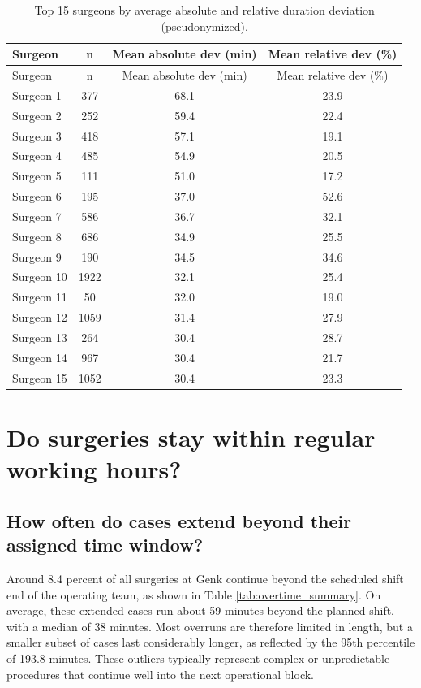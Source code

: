 \documentclass[
]{article}
\begin{document}
\begin{longtable}[]{@{}lccc@{}}
\caption{Top 15 surgeons by average absolute and relative duration
deviation (pseudonymized). \label{tab:surgeon_deviation}}\tabularnewline
\toprule\noalign{}
Surgeon & n & Mean absolute dev (min) & Mean relative dev (\%) \\
\midrule\noalign{}
\endfirsthead
\toprule\noalign{}
Surgeon & n & Mean absolute dev (min) & Mean relative dev (\%) \\
\midrule\noalign{}
\endhead
\bottomrule\noalign{}
\endlastfoot
Surgeon 1 & 377 & 68.1 & 23.9 \\
Surgeon 2 & 252 & 59.4 & 22.4 \\
Surgeon 3 & 418 & 57.1 & 19.1 \\
Surgeon 4 & 485 & 54.9 & 20.5 \\
Surgeon 5 & 111 & 51.0 & 17.2 \\
Surgeon 6 & 195 & 37.0 & 52.6 \\
Surgeon 7 & 586 & 36.7 & 32.1 \\
Surgeon 8 & 686 & 34.9 & 25.5 \\
Surgeon 9 & 190 & 34.5 & 34.6 \\
Surgeon 10 & 1922 & 32.1 & 25.4 \\
Surgeon 11 & 50 & 32.0 & 19.0 \\
Surgeon 12 & 1059 & 31.4 & 27.9 \\
Surgeon 13 & 264 & 30.4 & 28.7 \\
Surgeon 14 & 967 & 30.4 & 21.7 \\
Surgeon 15 & 1052 & 30.4 & 23.3 \\
\end{longtable}

\newpage

\section{Do surgeries stay within regular working
hours?}\label{do-surgeries-stay-within-regular-working-hours}

\subsection{How often do cases extend beyond their assigned time
window?}\label{how-often-do-cases-extend-beyond-their-assigned-time-window}

Around 8.4 percent of all surgeries at Genk continue beyond the
scheduled shift end of the operating team, as shown in Table
\ref{tab:overtime_summary}. On average, these extended cases run about
59 minutes beyond the planned shift, with a median of 38 minutes. Most
overruns are therefore limited in length, but a smaller subset of cases
last considerably longer, as reflected by the 95th percentile of 193.8
minutes. These outliers typically represent complex or unpredictable
procedures that continue well into the next operational block.
\end{document}
